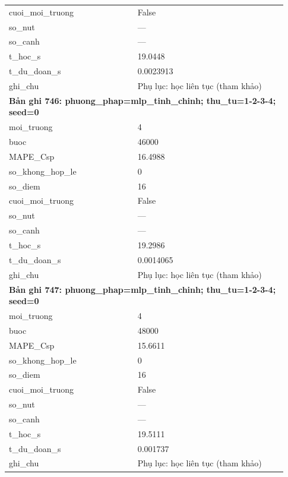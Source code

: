 \begin{longtable}{p{0.43\linewidth}p{0.50\linewidth}}
cuoi\_\allowbreak moi\_\allowbreak truong & False \\
so\_\allowbreak nut & — \\
so\_\allowbreak canh & — \\
t\_\allowbreak hoc\_\allowbreak s & 19.0448 \\
t\_\allowbreak du\_\allowbreak doan\_\allowbreak s & 0.0023913 \\
ghi\_\allowbreak chu & Phụ lục: học liên tục (tham khảo) \\
\midrule
\multicolumn{2}{p{0.95\linewidth}}{\textbf{Bản ghi 746: phuong\_phap=mlp\_tinh\_chinh; thu\_tu=1-2-3-4; seed=0}} \\
moi\_\allowbreak truong & 4 \\
buoc & 46000 \\
MAPE\_\allowbreak Csp & 16.4988 \\
so\_\allowbreak khong\_\allowbreak hop\_\allowbreak le & 0 \\
so\_\allowbreak diem & 16 \\
cuoi\_\allowbreak moi\_\allowbreak truong & False \\
so\_\allowbreak nut & — \\
so\_\allowbreak canh & — \\
t\_\allowbreak hoc\_\allowbreak s & 19.2986 \\
t\_\allowbreak du\_\allowbreak doan\_\allowbreak s & 0.0014065 \\
ghi\_\allowbreak chu & Phụ lục: học liên tục (tham khảo) \\
\midrule
\multicolumn{2}{p{0.95\linewidth}}{\textbf{Bản ghi 747: phuong\_phap=mlp\_tinh\_chinh; thu\_tu=1-2-3-4; seed=0}} \\
moi\_\allowbreak truong & 4 \\
buoc & 48000 \\
MAPE\_\allowbreak Csp & 15.6611 \\
so\_\allowbreak khong\_\allowbreak hop\_\allowbreak le & 0 \\
so\_\allowbreak diem & 16 \\
cuoi\_\allowbreak moi\_\allowbreak truong & False \\
so\_\allowbreak nut & — \\
so\_\allowbreak canh & — \\
t\_\allowbreak hoc\_\allowbreak s & 19.5111 \\
t\_\allowbreak du\_\allowbreak doan\_\allowbreak s & 0.001737 \\
ghi\_\allowbreak chu & Phụ lục: học liên tục (tham khảo) \\

\end{longtable}
